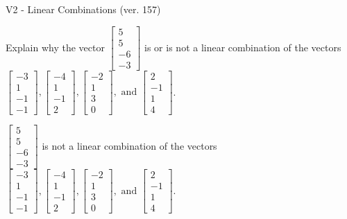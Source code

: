 \begin{exercise}
  \begin{exerciseTitle}V2 - Linear Combinations (ver. 157)\end{exerciseTitle}
  \begin{exerciseStatement}
    Explain why the vector \(\left[\begin{array}{c}
5 \\
5 \\
-6 \\
-3
\end{array}\right]\)  is or is not a linear 
	combination of the vectors \(\left[\begin{array}{c}
-3 \\
1 \\
-1 \\
-1
\end{array}\right] , \left[\begin{array}{c}
-4 \\
1 \\
-1 \\
2
\end{array}\right] , \left[\begin{array}{c}
-2 \\
1 \\
3 \\
0
\end{array}\right] , \text{ and } \left[\begin{array}{c}
2 \\
-1 \\
1 \\
4
\end{array}\right]\).
	


  \end{exerciseStatement}
  \begin{exerciseAnswer}
   \(\left[\begin{array}{c}
5 \\
5 \\
-6 \\
-3
\end{array}\right]\) 
  	 is not  
	a linear combination of the vectors \(\left[\begin{array}{c}
-3 \\
1 \\
-1 \\
-1
\end{array}\right] , \left[\begin{array}{c}
-4 \\
1 \\
-1 \\
2
\end{array}\right] , \left[\begin{array}{c}
-2 \\
1 \\
3 \\
0
\end{array}\right] , \text{ and } \left[\begin{array}{c}
2 \\
-1 \\
1 \\
4
\end{array}\right]\).


\end{exerciseAnswer}
\end{exercise}
